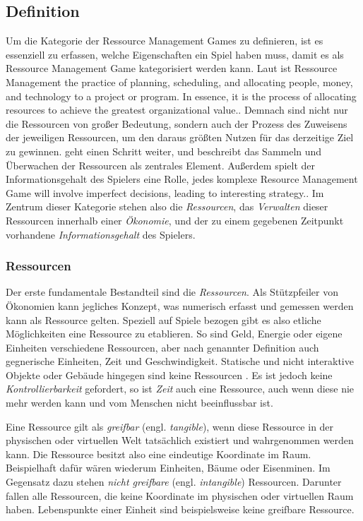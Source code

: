 \subsection{Definition}

Um die Kategorie der Ressource Management Games zu definieren, ist es essenziell zu erfassen, welche Eigenschaften ein Spiel haben muss, damit es als Ressource Management Game kategorisiert werden kann. Laut \cite*[]{definition:ressourcemanagement} ist Ressource Management \glqq [...] the practice of planning, scheduling, and allocating people, money, and technology to a project or program. In essence, it is the process of allocating resources to achieve the greatest organizational value.\grqq. Demnach sind nicht nur die Ressourcen von großer Bedeutung, sondern auch der Prozess des Zuweisens der jeweiligen Ressourcen, um den daraus größten Nutzen für das derzeitige Ziel zu gewinnen. \cite*[]{definition:ressourcemanagementfandom} geht einen Schritt weiter, und beschreibt das Sammeln und Überwachen der Ressourcen als zentrales Element. Außerdem spielt der Informationsgehalt des Spielers eine Rolle, jedes komplexe Resource Management Game \glqq [...] will involve imperfect decisions, leading to interesting strategy.\grqq \cite*[]{definition:ressourcemanagementfandom}. 
Im Zentrum dieser Kategorie stehen also die \textit{Ressourcen}, das \textit{Verwalten} dieser Ressourcen innerhalb einer \textit{Ökonomie}, und der zu einem gegebenen Zeitpunkt vorhandene \textit{Informationsgehalt} des Spielers.

\subsubsection{Ressourcen}
Der erste fundamentale Bestandteil sind die \textit{Ressourcen}. Als Stützpfeiler von Ökonomien kann jegliches Konzept, was numerisch erfasst und gemessen werden kann als Ressource gelten. Speziell auf Spiele bezogen gibt es also etliche Möglichkeiten eine Ressource zu etablieren. So sind Geld, Energie oder eigene Einheiten verschiedene Ressourcen, aber nach genannter Definition auch gegnerische Einheiten, Zeit und Geschwindigkeit. Statische und nicht interaktive Objekte oder Gebäude hingegen sind keine Ressourcen \cite*[]{book:gamedesign:resources}. Es ist jedoch keine \textit{Kontrollierbarkeit} gefordert, so ist \textit{Zeit} auch eine Ressource, auch wenn diese nie mehr werden kann und vom Menschen nicht beeinflussbar ist.

Eine Ressource gilt als \textit{greifbar} (engl. \textit{tangible}), wenn diese Ressource in der physischen oder virtuellen Welt tatsächlich existiert und wahrgenommen werden kann. Die Ressource besitzt also eine eindeutige Koordinate im Raum. Beispielhaft dafür wären wiederum Einheiten, Bäume oder Eisenminen. Im Gegensatz dazu stehen \textit{nicht greifbare} (engl. \textit{intangible}) Ressourcen. Darunter fallen alle Ressourcen, die keine Koordinate im physischen oder virtuellen Raum haben. Lebenspunkte einer Einheit sind beispielsweise keine greifbare Ressource. 

